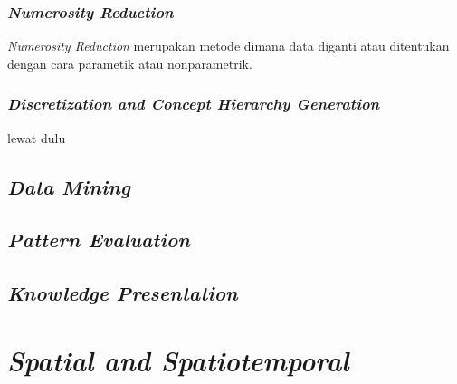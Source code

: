 \subsubsection {\textsl{Numerosity Reduction}}
\textsl{Numerosity Reduction} merupakan metode dimana data diganti atau ditentukan dengan cara parametik atau nonparametrik.

\subsubsection {\textsl{Discretization and Concept Hierarchy Generation}}
lewat dulu

\subsection{\textsl{Data Mining}}
\subsection{\textsl{Pattern Evaluation}}
\subsection{\textsl{Knowledge Presentation}}

\section{\textsl{Spatial and Spatiotemporal}}
